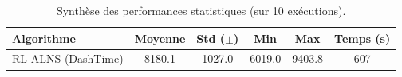 \begin{table}[h]
\centering
\small
\begin{tabular}{|l|c|c|c|c|c|}
\hline
\textbf{Algorithme} & \textbf{Moyenne} & \textbf{Std ($\pm$)} & \textbf{Min} & \textbf{Max} & \textbf{Temps (s)} \\ \hline
RL-ALNS (DashTime) & 8180.1 & 1027.0 & 6019.0 & 9403.8 & 607 \\ \hline
\end{tabular}
\caption{Synthèse des performances statistiques (sur 10 exécutions).}
\label{tab:stats_comparative}
\end{table}